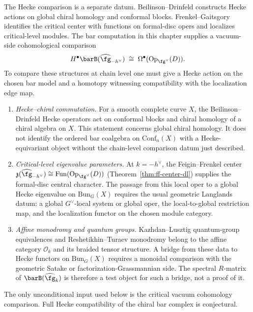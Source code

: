 \begin{remark}
\label{rem:hecke-chiral-compatibility}
\ClaimStatusConjectured
{}
The Hecke comparison is a separate datum. Beilinson--Drinfeld
constructs Hecke actions on global chiral homology and conformal
blocks. Frenkel--Gaitsgory identifies the critical center with
functions on formal-disc opers and localizes critical-level modules.
The bar computation in this chapter supplies a vacuum-side
cohomological comparison
\[
 H^\bullet\barB(\widehat{\fg}_{-h^\vee})
 \;\cong\;
 \Omega^\bullet(\mathrm{Op}_{\fg^\vee}(D)).
\]
To compare these structures at chain level one must give a Hecke
action on the chosen bar model and a homotopy witnessing compatibility
with the localization edge map.
\begin{enumerate}[label=\textup{(\roman*)}]
\item \emph{Hecke--chiral commutation.}
For a smooth complete curve $X$, the Beilinson--Drinfeld Hecke
operators act on conformal blocks and chiral homology of a chiral
algebra on $X$. This statement concerns global chiral homology. It
does not identify the ordered bar coalgebra on $\mathrm{Conf}_n(X)$
with a Hecke-equivariant object without the chain-level comparison
datum just described.
\item \emph{Critical-level eigenvalue parameters.}
At $k = -h^\vee$, the Feigin--Frenkel center
$\mathfrak{z}(\widehat{\fg}_{-h^\vee})
\cong \mathrm{Fun}(\mathrm{Op}_{\fg^\vee}(D))$
(Theorem~\ref{thm:ff-center-dl}) supplies the formal-disc central
character. The passage from this local oper to a global Hecke
eigenvalue on $\mathrm{Bun}_G(X)$ requires the usual geometric
Langlands datum: a global $G^\vee$-local system or global oper, the
local-to-global restriction map, and the localization functor on the
chosen module category.
\item \emph{Affine monodromy and quantum groups.}
Kazhdan--Lusztig quantum-group equivalences and Reshetikhin--Turaev
monodromy belong to the affine category $\mathcal O_k$ and its
braided tensor structure. A bridge from these data to Hecke functors
on $\mathrm{Bun}_G(X)$ requires a monoidal comparison with the
geometric Satake or factorization-Grassmannian side. The spectral
$R$-matrix of $\barB(\widehat{\fg}_k)$ is therefore a test object for
such a bridge, not a proof of it.
\end{enumerate}
The only unconditional input used below is the critical vacuum
cohomology comparison. Full Hecke compatibility of the chiral bar
complex is conjectural.
\end{remark}
